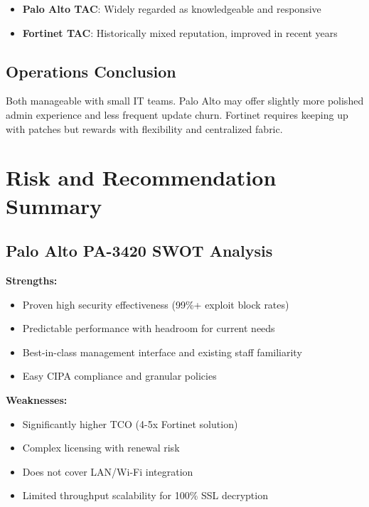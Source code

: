 \documentclass[12pt]{article}
\begin{document}
\begin{itemize}
    \item \textbf{Palo Alto TAC}: Widely regarded as knowledgeable and responsive
    \item \textbf{Fortinet TAC}: Historically mixed reputation, improved in recent years
\end{itemize}

\subsection{Operations Conclusion}

Both manageable with small IT teams. Palo Alto may offer slightly more polished admin experience and less frequent update churn. Fortinet requires keeping up with patches but rewards with flexibility and centralized fabric.

\section{Risk and Recommendation Summary}

\subsection{Palo Alto PA-3420 SWOT Analysis}

\textbf{Strengths:}
\begin{itemize}
    \item Proven high security effectiveness (99\%+ exploit block rates) \cite{cyberratings2023exclusivenetworks}
    \item Predictable performance with headroom for current needs
    \item Best-in-class management interface and existing staff familiarity
    \item Easy CIPA compliance and granular policies
\end{itemize}

\textbf{Weaknesses:}
\begin{itemize}
    \item Significantly higher TCO (4-5x Fortinet solution) \cite{comparisontable}
    \item Complex licensing with renewal risk \cite{gartnerpeer2024}
    \item Does not cover LAN/Wi-Fi integration
    \item Limited throughput scalability for 100\% SSL decryption
\end{itemize}
\end{document}
